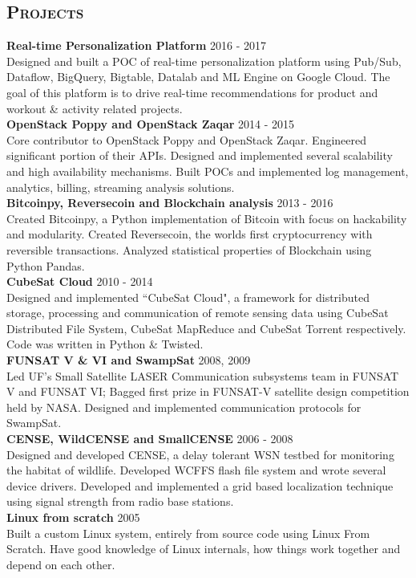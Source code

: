 \begin{resume}
\section{\textsc{Projects}}
\textbf{Real-time Personalization Platform} \hfill 2016 - 2017\\
Designed and built a POC of real-time personalization platform using Pub/Sub, Dataflow, BigQuery, Bigtable, Datalab and ML Engine on Google Cloud. The goal of this platform is to drive real-time recommendations for product and workout \& activity related projects.\\
\textbf{OpenStack Poppy and OpenStack Zaqar} \hfill 2014 - 2015\\
Core contributor to OpenStack Poppy and OpenStack Zaqar. Engineered significant portion of their APIs. Designed and implemented several scalability and high availability mechanisms. Built POCs and implemented log management, analytics, billing, streaming analysis solutions.\\
\textbf{Bitcoinpy, Reversecoin and Blockchain analysis} \hfill 2013 - 2016\\
Created Bitcoinpy, a Python implementation of Bitcoin with focus on hackability and modularity. Created Reversecoin, the worlds first cryptocurrency with reversible transactions. Analyzed statistical properties of Blockchain using Python Pandas.\\
\textbf{CubeSat Cloud} \hfill 2010 - 2014 \\
Designed and implemented ``CubeSat Cloud", a framework for distributed storage, processing and communication of remote sensing data using CubeSat Distributed File System, CubeSat MapReduce and CubeSat Torrent respectively. Code was written in Python \& Twisted.\\
\textbf{FUNSAT V \& VI and SwampSat} \hfill 2008, 2009 \\
Led UF's Small Satellite LASER Communication subsystems team in FUNSAT V and FUNSAT VI; Bagged first prize in FUNSAT-V satellite design competition held by NASA. Designed and implemented communication protocols for SwampSat.\\
\textbf{CENSE, WildCENSE and SmallCENSE} \hfill 2006 - 2008\\
Designed and developed CENSE, a delay tolerant WSN testbed for monitoring the habitat of wildlife. Developed WCFFS flash file system and wrote several device drivers. Developed and implemented a grid based localization technique using signal strength from radio base stations.\\
\textbf{Linux from scratch} \hfill 2005 \\
Built a custom Linux system, entirely from source code using Linux From Scratch. Have good knowledge of Linux internals, how things work together and depend on each other.


\end{resume}
